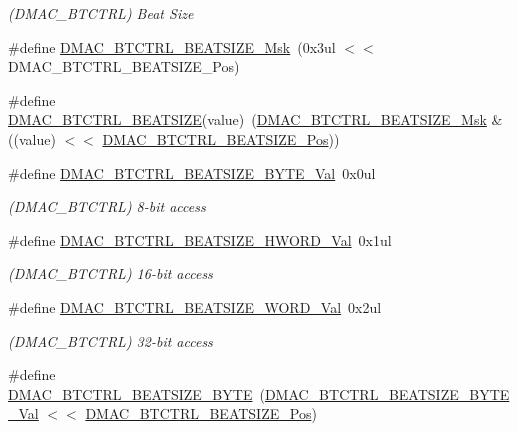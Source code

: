 \begin{DoxyCompactItemize}
\begin{DoxyCompactList}\small\item\em (D\+M\+A\+C\+\_\+\+B\+T\+C\+T\+RL) Beat Size \end{DoxyCompactList}\item 
\#define \mbox{\hyperlink{group___s_a_m_d21___d_m_a_c_gaf5c9d9b90c75d827a93c7d6c6703dd44}{D\+M\+A\+C\+\_\+\+B\+T\+C\+T\+R\+L\+\_\+\+B\+E\+A\+T\+S\+I\+Z\+E\+\_\+\+Msk}}~(0x3ul $<$$<$ D\+M\+A\+C\+\_\+\+B\+T\+C\+T\+R\+L\+\_\+\+B\+E\+A\+T\+S\+I\+Z\+E\+\_\+\+Pos)
\item 
\#define \mbox{\hyperlink{group___s_a_m_d21___d_m_a_c_gaaa064d90101faeea6f9c17ba2c7b139c}{D\+M\+A\+C\+\_\+\+B\+T\+C\+T\+R\+L\+\_\+\+B\+E\+A\+T\+S\+I\+ZE}}(value)~(\mbox{\hyperlink{group___s_a_m_d21___d_m_a_c_gaf5c9d9b90c75d827a93c7d6c6703dd44}{D\+M\+A\+C\+\_\+\+B\+T\+C\+T\+R\+L\+\_\+\+B\+E\+A\+T\+S\+I\+Z\+E\+\_\+\+Msk}} \& ((value) $<$$<$ \mbox{\hyperlink{group___s_a_m_d21___d_m_a_c_ga4961493aedfe85b741e91f8370b9586c}{D\+M\+A\+C\+\_\+\+B\+T\+C\+T\+R\+L\+\_\+\+B\+E\+A\+T\+S\+I\+Z\+E\+\_\+\+Pos}}))
\item 
\#define \mbox{\hyperlink{group___s_a_m_d21___d_m_a_c_gaf6172f239bfecdded8cc118f3a5ac687}{D\+M\+A\+C\+\_\+\+B\+T\+C\+T\+R\+L\+\_\+\+B\+E\+A\+T\+S\+I\+Z\+E\+\_\+\+B\+Y\+T\+E\+\_\+\+Val}}~0x0ul
\begin{DoxyCompactList}\small\item\em (D\+M\+A\+C\+\_\+\+B\+T\+C\+T\+RL) 8-\/bit access \end{DoxyCompactList}\item 
\#define \mbox{\hyperlink{group___s_a_m_d21___d_m_a_c_ga2f763ae7b69389c853910c3486543e84}{D\+M\+A\+C\+\_\+\+B\+T\+C\+T\+R\+L\+\_\+\+B\+E\+A\+T\+S\+I\+Z\+E\+\_\+\+H\+W\+O\+R\+D\+\_\+\+Val}}~0x1ul
\begin{DoxyCompactList}\small\item\em (D\+M\+A\+C\+\_\+\+B\+T\+C\+T\+RL) 16-\/bit access \end{DoxyCompactList}\item 
\#define \mbox{\hyperlink{group___s_a_m_d21___d_m_a_c_ga17adb4e5668571563f3f60743b7d0d4e}{D\+M\+A\+C\+\_\+\+B\+T\+C\+T\+R\+L\+\_\+\+B\+E\+A\+T\+S\+I\+Z\+E\+\_\+\+W\+O\+R\+D\+\_\+\+Val}}~0x2ul
\begin{DoxyCompactList}\small\item\em (D\+M\+A\+C\+\_\+\+B\+T\+C\+T\+RL) 32-\/bit access \end{DoxyCompactList}\item 
\#define \mbox{\hyperlink{group___s_a_m_d21___d_m_a_c_ga96d0898f8d8c76aa6a47dc2e8312cdd2}{D\+M\+A\+C\+\_\+\+B\+T\+C\+T\+R\+L\+\_\+\+B\+E\+A\+T\+S\+I\+Z\+E\+\_\+\+B\+Y\+TE}}~(\mbox{\hyperlink{group___s_a_m_d21___d_m_a_c_gaf6172f239bfecdded8cc118f3a5ac687}{D\+M\+A\+C\+\_\+\+B\+T\+C\+T\+R\+L\+\_\+\+B\+E\+A\+T\+S\+I\+Z\+E\+\_\+\+B\+Y\+T\+E\+\_\+\+Val}} $<$$<$ \mbox{\hyperlink{group___s_a_m_d21___d_m_a_c_ga4961493aedfe85b741e91f8370b9586c}{D\+M\+A\+C\+\_\+\+B\+T\+C\+T\+R\+L\+\_\+\+B\+E\+A\+T\+S\+I\+Z\+E\+\_\+\+Pos}})
$$
\end{DoxyCompactItemize}
